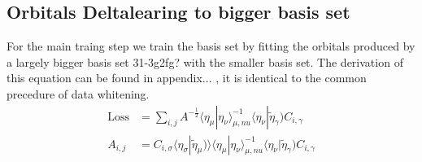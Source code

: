 \subsection{Orbitals Deltalearing to bigger basis set}
For the main traing step we train the basis set by fitting the orbitals produced by a largely bigger basis set 31-3g2fg? with the smaller basis set.
The derivation of this equation can be found in appendix... , it is identical to the common precedure of data whitening.
\begin{align}
    \text{Loss} &= \sum_{i,j} A^{-\frac{1}{2}} \langle\eta_\mu|\eta_\nu\rangle^{-1}_{\mu,nu} \langle\eta_\nu|\tilde\eta_\gamma) C_{i,\gamma}\\
    A_{i,j}&=C_{i,\sigma}\langle\eta_\sigma|\tilde\eta_\mu)\rangle \langle\eta_\mu|\eta_\nu\rangle^{-1}_{\mu,nu} \langle\eta_\nu|\tilde\eta_\gamma) C_{i,\gamma}\\
\end{align}






